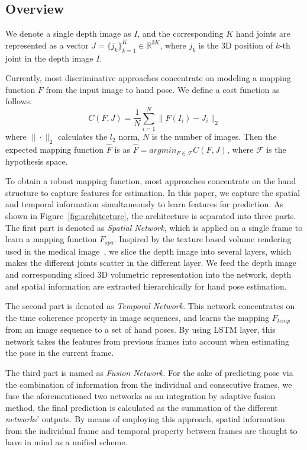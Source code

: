 \documentclass[journal,comsoc]{IEEEtran}
\def \j{\bm{\mathit{j}}}
\def \J{\bm{\mathit{J}}}
\def \I{\mathit{I}}
\begin{document}
\subsection{Overview}\label{sec:overview}
We denote a single depth image as $\I$, and the corresponding $K$ hand joints are represented as a vector
$\J=\{\j_k\}_{k=1}^K \in \mathbb{R}^{3K}$, where $\j_k$
is the 3D position of $k$-th joint in the depth image $\I$.

Currently, most discriminative approaches concentrate on modeling a mapping function $F$ from the input image to hand pose.
We define a cost function as follows:
\begin{equation}\label{eq:cost}
C(F, \J) = \frac{1}{N}\sum_{i=1}^N\|F(I_i) - \J_i\|_2
\end{equation}
where $\|\cdot\|_2$ calculates the $l_2$ norm, $N$ is the number of images. Then the expected mapping function $\hat{F}$ is \expressed as $\hat{F} = argmin_{F \in \mathcal{F}} C(F, \J)$, where $\mathcal{F}$ is the hypothesis space.

To obtain a robust mapping function, most approaches concentrate on the hand structure to capture features for estimation.
In this paper, we capture the spatial and temporal information simultaneously to learn features for prediction.
As shown in Figure~\ref{fig:architecture}, the architecture is separated into three parts.
The first part is denoted as \emph{Spatial Network}, which is applied on a single frame to learn a mapping function $F_{spa}$.
Inspired by the texture based volume rendering used in the medical image~\cite{hopf1999accelerating}, we slice the depth
image into several layers, which makes the different joints scatter in the different layer. We feed the depth image and
corresponding sliced 3D volumetric representation into the network, depth and spatial information are extracted hierarchically
for hand pose estimation.

The second part is denoted as \emph{Temporal Network}. This network concentrates on the time coherence property in image sequences,
and learns the mapping $F_{temp}$ from an image sequence to a set of hand poses. By using LSTM layer,
this network takes the features from previous frames into account when estimating the pose in the current frame.

The third part is named as \emph{Fusion Network}. For the sake of predicting pose via the combination of information from the
individual and consecutive frames, we fuse the aforementioned two networks as an integration by adaptive fusion method,
the final prediction is calculated as the summation
of the different \textit{network}s' outputs. By means of employing this approach,
spatial information from the individual frame and temporal
property between frames are thought to have in mind as a unified scheme.
\end{document}
